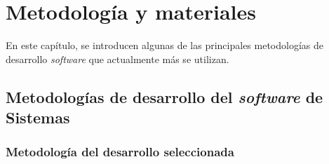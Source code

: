 \chapter{Metodología y materiales}
\label{chapter:metodologia}

En este capítulo, se introducen algunas de las principales metodologías de desarrollo \textit{software} que actualmente más se utilizan.

\section{Metodologías de desarrollo del \textit{software} de Sistemas}


%            


\subsection*{Metodología del desarrollo seleccionada}

